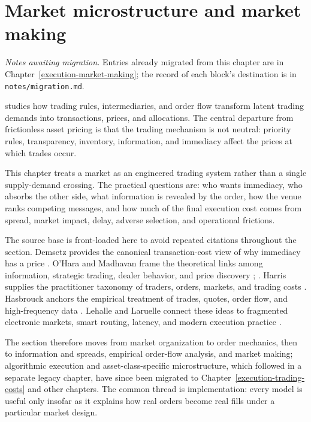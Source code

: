 \chapter{Market microstructure and market making}\label{legacy:execution-market-making}

\noindent\emph{Notes awaiting migration.} Entries already migrated from this chapter are in Chapter~\ref{execution-market-making}; the record of each block's destination is in \texttt{notes/migration.md}.

 studies how trading rules, intermediaries, and order flow transform latent trading demands into transactions, prices, and allocations. The central departure from frictionless asset pricing is that the trading mechanism is not neutral: priority rules, transparency, inventory, information, and immediacy affect the prices at which trades occur.

This chapter treats a market as an engineered trading system rather than a single supply-demand crossing. The practical questions are: who wants immediacy, who absorbs the other side, what information is revealed by the order, how the venue ranks competing messages, and how much of the final execution cost comes from spread, market impact, delay, adverse selection, and operational frictions.

The source base is front-loaded here to avoid repeated citations throughout the section. Demsetz provides the canonical transaction-cost view of why immediacy has a price \citep{demsetz-1968}. O'Hara and Madhavan frame the theoretical links among information, strategic trading, dealer behavior, and price discovery \citep{catalogue-0496}; \citep{madhavan-2000}. Harris supplies the practitioner taxonomy of traders, orders, markets, and trading costs \citep{alpha-harris}. Hasbrouck anchors the empirical treatment of trades, quotes, order flow, and high-frequency data \citep{s6-hasbrouck}. Lehalle and Laruelle connect these ideas to fragmented electronic markets, smart routing, latency, and modern execution practice \citep{alpha-laruelle}.

The section therefore moves from market organization to order mechanics, then to information and spreads, empirical order-flow analysis, and market making; algorithmic execution and asset-class-specific microstructure, which followed in a separate legacy chapter, have since been migrated to Chapter~\ref{execution-trading-costs} and other chapters. The common thread is implementation: every model is useful only insofar as it explains how real orders become real fills under a particular market design.

